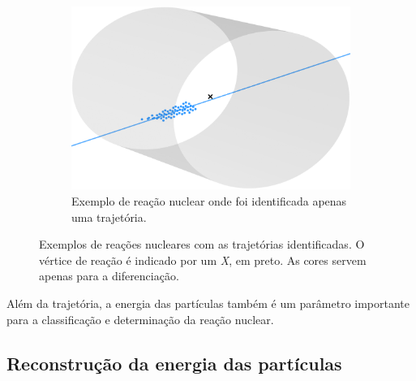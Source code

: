 \documentclass[a4paper,12pt,oneside]{book}
\begin{document}
\begin{figure}[H]
\begin{subfigure}[t]{0.45\textwidth}
        \includegraphics[scale=0.5, width=.95\columnwidth]{figs/results_ex_1_track_num_220.png}
        \caption{Exemplo de reação nuclear onde foi identificada apenas uma trajetória.}
        \label{subfig:res_exemplo_1_track}
    \end{subfigure}
\caption{Exemplos de reações nucleares com as trajetórias identificadas. O vértice de reação é indicado por um \textit{X}, em preto. As cores servem apenas para a diferenciação.}
\label{fig:res_tracks}
\end{figure}


\par Além da trajetória, a energia das partículas também é um parâmetro importante para a classificação e determinação da reação nuclear.

\subsection{Reconstrução da energia das partículas}

\end{document}
